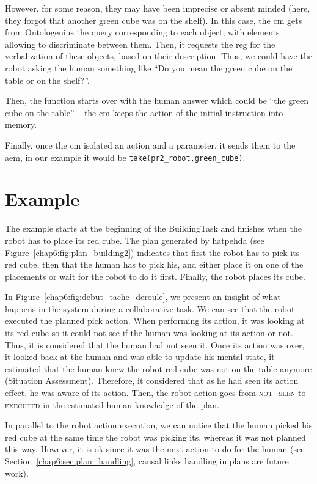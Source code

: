 \documentclass[a4paper,11pt,twoside]{StyleThese}
\begin{document}
However, for some reason, they may have been imprecise or absent minded (\eg here, they forgot that another green cube was on the shelf). In this case, the \acrshort{cm} gets from Ontologenius the \sparql{} query corresponding to each object, with elements allowing to discriminate between them. Then, it requests the \acrshort{reg} for the verbalization of these objects, based on their \sparql{} description. Thus, we could have the robot asking the human something like ``Do you mean the green cube on the table or on the shelf?''. 

Then, the function starts over with the human answer which could be ``the green cube on the table'' -- the \acrshort{cm} keeps the action of the initial instruction into memory.

Finally, once the \acrshort{cm} isolated an action and a parameter, it sends them to the \acrlong{aem}, in our example it would be \verb'take(pr2_robot,green_cube)'.

\section{Example}
\thispagestyle{example}
The example starts at the beginning of the BuildingTask and finishes when the robot has to place its red cube. The plan generated by \acrshort{hatpehda} (see Figure~\ref{chap6:fig:plan_building2}) indicates that first the robot has to pick its red cube, then that the human has to pick his, and either place it on one of the placements or wait for the robot to do it first. Finally, the robot places its cube. 

In Figure~\ref{chap6:fig:debut_tache_deroule}, we present an insight of what happens in the system during a collaborative task. We can see that the robot executed the planned pick action. When performing its action, it was looking at its red cube so it could not see if the human was looking at its action or not. Thus, it is considered that the human had not seen it. Once its action was over, it looked back at the human and was able to update his mental state, \ie it estimated that the human knew the robot red cube was not on the table anymore (Situation Assessment). Therefore, it considered that as he had seen its action effect, he was aware of its action. Then, the robot action goes from \textsc{not\_seen} to \textsc{executed} in the estimated human knowledge of the plan. 

In parallel to the robot action execution, we can notice that the human picked his red cube at the same time the robot was picking its, whereas it was not planned this way. However, it is ok since it was the next action to do for the human (see Section~\ref{chap6:sec:plan_handling}, causal links handling in plans are future work). 
\end{document}
